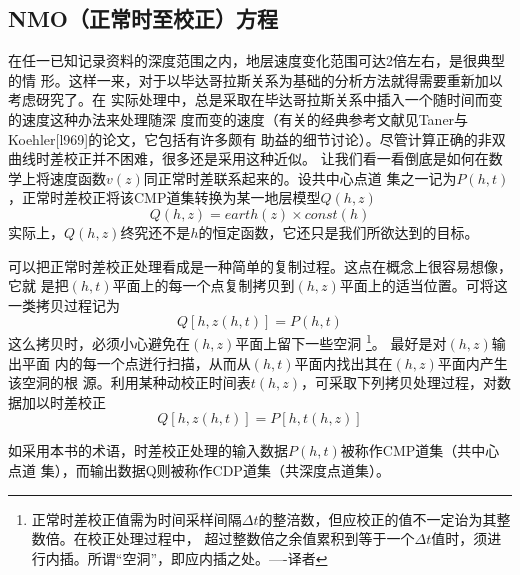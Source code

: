 \subsection{NMO（正常时至校正）方程}
\label{sec:3.5.4}

在任一已知记录资料的深度范围之内，地层速度变化范围可达2倍左右，是很典型的情
形。这样一来，对于以毕达哥拉斯关系为基础的分析方法就得需要重新加以考虑砑究了。在
实际处理中，总是采取在毕达哥拉斯关系中插入一个随时间而变的速度这种办法来处理随深
度而变的速度（有关的经典参考文献见Taner与Koehler[l969]的论文，它包括有许多颇有
助益的细节讨论）。尽管计算正确的非双曲线时差校正并不困难，很多还是采用这种近似。
让我们看一看倒底是如何在数学上将速度函数$v(z)$同正常时差联系起来的。设共中心点道
集之一记为$P(h,t)$，正常时差校正将该CMP道集转换为某一地层模型$Q(h,z)$
\begin{equation}
Q(h,z)=earth(z)\times const(h)
\label{eq:ex3.5.1}
\end{equation}
实际上，$Q(h,z)$终究还不是$h$的恒定函数，它还只是我们所欲达到的目标。

可以把正常时差校正处理看成是一种简单的复制过程。这点在概念上很容易想像，它就
是把$(h,t)$平面上的每一个点复制拷贝到$(h,z)$平面上的适当位置。可将这一类拷贝过程记为
\begin{equation}
Q[h,z(h,t)]=P(h,t)
\label{eq:ex3.5.2}
\end{equation}
这么拷贝时，必须小心避免在$(h,z)$平面上留下一些空洞
\footnote{正常时差校正值需为时间采样间隔$\Delta t$的整涪数，但应校正的值不一定诒为其整数倍。在校正处理过程中，
超过整数倍之余值累积到等于一个$\Delta t$值时，须进行内插。所谓“空洞”，即应内插之处。----译者}。
最好是对$(h,z)$输出平面
内的每一个点迸行扫描，从而从$(h,t)$平面内找出其在$(h,z)$平面内产生该空洞的根
源。利用某种动校正时间表$t(h,z)$，可采取下列拷贝处理过程，对数据加以时差校正
\begin{equation}
Q[h,z(h,t)]=P[h,t(h,z)]
\label{eq:ex3.5.3}
\end{equation}

如采用本书的术语，时差校正处理的输入数据$P(h,t)$被称作CMP道集（共中心点道
集），而输出数据Q则被称作CDP道集（共深度点道集）。

